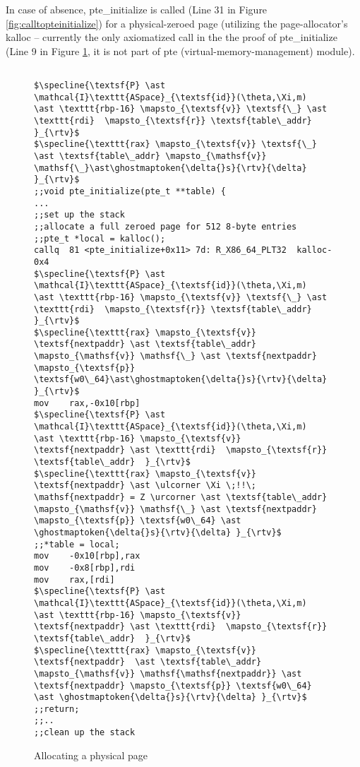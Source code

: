  In case of absence, \textsf{pte\_initialize} is called (Line 31 in Figure \ref{fig:calltopteinitialize}) for a physical-zeroed page (utilizing the page-allocator's \textsf{kalloc} -- currently the only axiomatized call in the the proof of \textsf{pte\_initialize} (Line 9 in Figure \ref{pteinitializespec}, it is not part of \textsf{pte} (virtual-memory-management) module). 
\begin{figure}\footnotesize
  \begin{lstlisting}[mathescape]

$\specline{\textsf{P} \ast \mathcal{I}\texttt{ASpace}_{\textsf{id}}(\theta,\Xi,m)   \ast \texttt{rbp-16} \mapsto_{\textsf{v}} \textsf{\_} \ast \texttt{rdi}  \mapsto_{\textsf{r}} \textsf{table\_addr}  }_{\rtv}$
$\specline{\texttt{rax} \mapsto_{\textsf{v}} \textsf{\_} \ast \textsf{table\_addr} \mapsto_{\mathsf{v}} \mathsf{\_}\ast\ghostmaptoken{\delta{}s}{\rtv}{\delta} }_{\rtv}$
;;void pte_initialize(pte_t **table) {
...
;;set up the stack    
;;allocate a full zeroed page for 512 8-byte entries 
;;pte_t *local = kalloc();
callq  81 <pte_initialize+0x11>	7d: R_X86_64_PLT32	kalloc-0x4
$\specline{\textsf{P} \ast \mathcal{I}\texttt{ASpace}_{\textsf{id}}(\theta,\Xi,m)   \ast \texttt{rbp-16} \mapsto_{\textsf{v}} \textsf{\_} \ast \texttt{rdi}  \mapsto_{\textsf{r}} \textsf{table\_addr}  }_{\rtv}$
$\specline{\texttt{rax} \mapsto_{\textsf{v}} \textsf{nextpaddr} \ast \textsf{table\_addr} \mapsto_{\mathsf{v}} \mathsf{\_} \ast \textsf{nextpaddr} \mapsto_{\textsf{p}} \textsf{w0\_64}\ast\ghostmaptoken{\delta{}s}{\rtv}{\delta} }_{\rtv}$
mov    rax,-0x10[rbp] 
$\specline{\textsf{P} \ast \mathcal{I}\texttt{ASpace}_{\textsf{id}}(\theta,\Xi,m)   \ast \texttt{rbp-16} \mapsto_{\textsf{v}} \textsf{nextpaddr} \ast \texttt{rdi}  \mapsto_{\textsf{r}} \textsf{table\_addr}  }_{\rtv}$
$\specline{\texttt{rax} \mapsto_{\textsf{v}} \textsf{nextpaddr} \ast \ulcorner \Xi \;!!\; \mathsf{nextpaddr} = Z \urcorner \ast \textsf{table\_addr} \mapsto_{\mathsf{v}} \mathsf{\_} \ast \textsf{nextpaddr} \mapsto_{\textsf{p}} \textsf{w0\_64} \ast \ghostmaptoken{\delta{}s}{\rtv}{\delta} }_{\rtv}$  
;;*table = local;
mov    -0x10[rbp],rax
mov    -0x8[rbp],rdi
mov    rax,[rdi]
$\specline{\textsf{P} \ast \mathcal{I}\texttt{ASpace}_{\textsf{id}}(\theta,\Xi,m)   \ast \texttt{rbp-16} \mapsto_{\textsf{v}} \textsf{nextpaddr} \ast \texttt{rdi}  \mapsto_{\textsf{r}} \textsf{table\_addr}  }_{\rtv}$
$\specline{\texttt{rax} \mapsto_{\textsf{v}} \textsf{nextpaddr}  \ast \textsf{table\_addr} \mapsto_{\mathsf{v}} \mathsf{\mathsf{nextpaddr}} \ast \textsf{nextpaddr} \mapsto_{\textsf{p}} \textsf{w0\_64} \ast \ghostmaptoken{\delta{}s}{\rtv}{\delta} }_{\rtv}$  
;;return;
;;..
;;clean up the stack
\end{lstlisting}
\vspace{-1em}
\caption{Allocating a physical page }
\label{pteinitializespec}
\end{figure}
